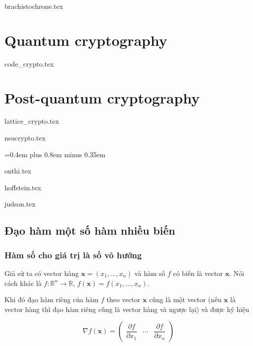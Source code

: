 \documentclass{mynotes}
\newcommand{\RR}{\mathbb{R}}
\begin{document}
{brachistochrone.tex}



\part{Quantum cryptography}

\parttoc



{code_crypto.tex}

\part{Post-quantum cryptography}

\parttoc

{lattice_crypto.tex}

{nsucrypto.tex}

{
 \spaceskip=0.4em plus 0.8em minus 0.35em
\printbibliography[env=gostbibliography,heading=bibintoc,title={Tài liệu tham khảo}]
}

\appendix

{onthi.tex}

{hoffstein.tex}

{judson.tex}

\chapter{Đạo hàm một số hàm nhiều biến}

\section*{Hàm số cho giá trị là số vô hướng}
	
Giả sử ta có vector hàng $\bm{x} = (x_1, \ldots, x_n)$ và hàm số $f$ có biến là vector $\bm{x}$. Nói cách khác là $f: \RR^n \to \RR$, $f(\bm{x}) = f(x_1, \ldots, x_n)$.

Khi đó đạo hàm riêng của hàm $f$ theo vector $\bm{x}$ cũng là một vector (nếu $\bm{x}$ là vector hàng thì đạo hàm riêng cũng là vector hàng và ngược lại) và được ký hiệu

\begin{equation*}
    \nabla f(\bm{x}) = \begin{pmatrix}
        \dfrac{\partial f}{\partial x_1} & \cdots & \dfrac{\partial f}{\partial x_n}
    \end{pmatrix}
\end{equation*}
\end{document}
